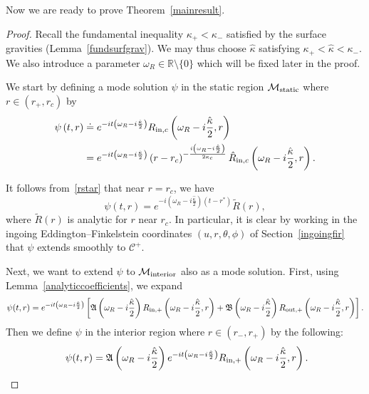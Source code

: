 \documentclass[A4,10pt]{article}
\begin{document}
Now we are ready to prove Theorem~\ref{mainresult}.
\begin{proof}
Recall the fundamental inequality $\kappa_+<\kappa_-$ satisfied by the surface gravities
(Lemma~\ref{fundsurfgrav}).
We may thus choose $\hat{\kappa}$ satisfying $\kappa_+ < \hat{\kappa} < \kappa_-$. 
We also introduce a parameter $\omega_R \in \mathbb{R}\setminus \{0\}$ which will be fixed later in the proof. 

We start by defining a mode solution $\psi$ in the static region
$\mathcal{M}_{\rm static}$ where $r \in (r_+,r_c)$ by
\begin{align}\label{thisisus}
\psi\left(t,r\right) &\doteq e^{-it\left(\omega_R - i\frac{\hat{\kappa}}{2}\right)}R_{{\rm in},c}\left(\omega_R - i\frac{\hat{\kappa}}{2},r\right)
\\ \nonumber &= e^{-it\left(\omega_R - i\frac{\hat{\kappa}}{2}\right)}\left(r-r_c\right)^{-\frac{i\left(\omega_R - i\frac{\hat{\kappa}}{2}\right)}{2\kappa_c}}\hat{R}_{{\rm in},c}\left(\omega_R - i\frac{\hat{\kappa}}{2},r\right).
\end{align}

It follows from~\eqref{rstar} that near $r = r_c$, we have
\[\psi(t,r) = e^{-i\left(\omega_R-i\frac{\hat{\kappa}}{2}\right)\left(t-r^*\right)}\tilde{R}\left(r\right),\]
where $\tilde{R}(r)$ is analytic for $r$ near $r_c$. In particular, it is clear by working in the ingoing Eddington--Finkelstein coordinates $\left(u,r,\theta,\phi\right)$ of Section~\ref{ingoingfir} that $\psi$ extends smoothly to $\mathcal{C}^+$. 

Next, we want to extend $\psi$ to $\mathcal{M}_{{\rm interior}}$ also as a mode solution. First, using Lemma~\ref{analyticcoefficients}, we expand
\begin{equation}\label{firstexpansion}
\psi(t,r) = e^{-it\left(\omega_R -i\frac{\hat{\kappa}}{2}\right)}\left[\mathfrak A\left(\omega_R-i\frac{\hat{\kappa}}{2}\right)R_{{\rm in},+}\left(\omega_R-i\frac{\hat{\kappa}}{2},r\right) + \mathfrak B\left(\omega_R-i\frac{\hat{\kappa}}{2}\right)R_{{\rm out},+}\left(\omega_R-i\frac{\hat{\kappa}}{2},r\right)\right].
\end{equation}
Then we define $\psi$ in the interior region where $r \in (r_-,r_+)$  by the following:\[\ \psi(t,r) = \mathfrak A\left(\omega_R-i\frac{\hat{\kappa}}{2}\right)e^{-it\left(\omega_R -i\frac{\hat{\kappa}}{2}\right)}R_{{\rm in},+}\left(\omega_R-i\frac{\hat{\kappa}}{2},r\right) .\]


\end{proof}
\end{document}
